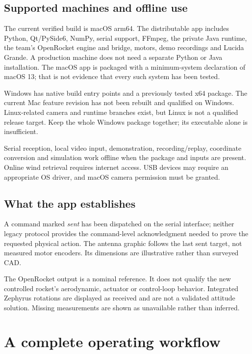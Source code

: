 \subsection{Supported machines and offline use}
The current verified build is macOS arm64. The distributable app includes Python,
Qt/PySide6, NumPy, serial support, FFmpeg, the private Java runtime, the team's
OpenRocket engine and bridge, motors, demo recordings and Lucida Grande. A
production machine does not need a separate Python or Java installation.
The macOS app is packaged with a minimum-system declaration of macOS 13; that is
not evidence that every such system has been tested.

Windows has native build entry points and a previously tested x64 package.
The current Mac feature revision has not been rebuilt and qualified on Windows.
Linux-related camera and runtime branches exist, but Linux is not a qualified
release target. Keep the whole Windows package together; its executable alone is
insufficient.

Serial reception, local video input, demonstration, recording/replay, coordinate
conversion and simulation work offline when the package and inputs are present.
Online wind retrieval requires internet access. USB devices may require an
appropriate OS driver, and macOS camera permission must be granted.

\subsection{What the app establishes}
A command marked \emph{sent} has been dispatched on the serial interface; neither
legacy protocol provides the command-level acknowledgment needed to prove the
requested physical action. The antenna graphic follows the last sent target,
not measured motor encoders. Its dimensions are illustrative rather than
surveyed CAD.

The OpenRocket output is a nominal reference. It does not qualify the new
controlled rocket's aerodynamic, actuator or control-loop behavior. Integrated
Zephyrus rotations are displayed as received and are not a validated attitude
solution. Missing measurements are shown as unavailable rather than inferred.

\section{A complete operating workflow}\label{sec:workflow}

